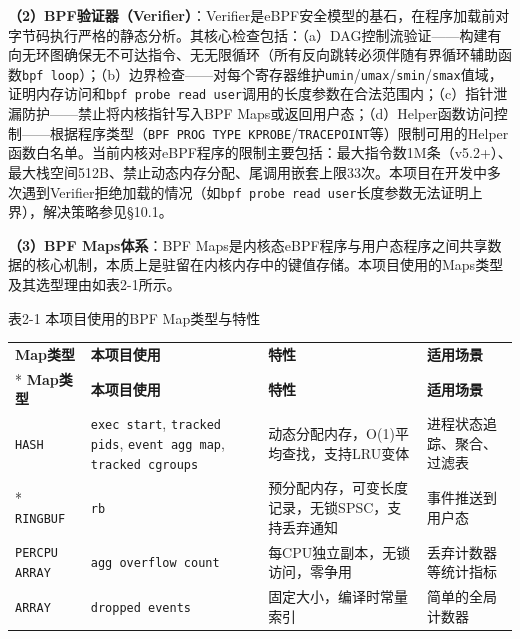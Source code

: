 \documentclass[a4paper]{ctexart}
\makeatletter
\renewcommand{\_}{%
  \ifmmode
    \nfss@text{\textunderscore}%
  \else
    \textunderscore\discretionary{}{}{}%
  \fi}
\makeatother
\begin{document}
\textbf{（2）BPF验证器（Verifier）}：Verifier是eBPF安全模型的基石，在程序加载前对字节码执行严格的静态分析。其核心检查包括：（a）DAG控制流验证——构建有向无环图确保无不可达指令、无无限循环（所有反向跳转必须伴随有界循环辅助函数\texttt{bpf\_loop}）；（b）边界检查——对每个寄存器维护\texttt{umin}/\texttt{umax}/\texttt{smin}/\texttt{smax}值域，证明内存访问和\texttt{bpf\_probe\_read\_user}调用的长度参数在合法范围内；（c）指针泄漏防护——禁止将内核指针写入BPF Maps或返回用户态；（d）Helper函数访问控制——根据程序类型（\texttt{BPF\_PROG\_TYPE\_KPROBE}/\texttt{TRACEPOINT}等）限制可用的Helper函数白名单。当前内核对eBPF程序的限制主要包括：最大指令数1M条（v5.2+）、最大栈空间512B、禁止动态内存分配、尾调用嵌套上限33次。本项目在开发中多次遇到Verifier拒绝加载的情况（如\texttt{bpf\_probe\_read\_user}长度参数无法证明上界），解决策略参见§10.1。


\textbf{（3）BPF Maps体系}：BPF Maps是内核态eBPF程序与用户态程序之间共享数据的核心机制，本质上是驻留在内核内存中的键值存储。本项目使用的Maps类型及其选型理由如表2-1所示。




\medskip
{\centering\small
表2-1 本项目使用的BPF Map类型与特性\par
\vspace{3pt}
\setlength{\tabcolsep}{6pt}
\renewcommand{\arraystretch}{1.1}
\begin{longtable}{p{4.3cm} >{\raggedright\arraybackslash}p{3.3cm} >{\raggedright\arraybackslash}p{3.3cm} >{\raggedright\arraybackslash}p{3.3cm}}
\hline
\textbf{Map类型} & \textbf{本项目使用} & \textbf{特性} & \textbf{适用场景} \\*
\hline
\endfirsthead
\hline
\textbf{Map类型} & \textbf{本项目使用} & \textbf{特性} & \textbf{适用场景} \\
\hline
\endhead
\hline
\endfoot
\hline
\endlastfoot
\texttt{HASH} & \texttt{exec\_start}, \texttt{tracked\_pids}, \texttt{event\_agg\_map}, \texttt{tracked\_cgroups} & 动态分配内存，O(1)平均查找，支持LRU变体 & 进程状态追踪、聚合、过滤表 \\*
\hline
\texttt{RINGBUF} & \texttt{rb} & 预分配内存，可变长度记录，无锁SPSC，支持丢弃通知 & 事件推送到用户态 \\
\hline
\texttt{PERCPU\_ARRAY} & \texttt{agg\_overflow\_count} & 每CPU独立副本，无锁访问，零争用 & 丢弃计数器等统计指标 \\
\hline
\texttt{ARRAY} & \texttt{dropped\_events} & 固定大小，编译时常量索引 & 简单的全局计数器 \\
\hline
\end{longtable}
\par}
\end{document}
